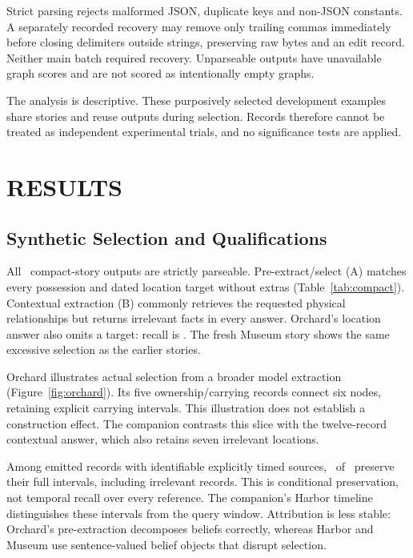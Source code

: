 \documentclass[a4paper,twoside]{article}
\begin{document}
Strict parsing rejects malformed JSON, duplicate keys and non-JSON constants. A separately recorded recovery may remove only trailing commas immediately before closing delimiters outside strings, preserving raw bytes and an edit record. Neither main batch required recovery. Unparseable outputs have unavailable graph scores and are not scored as intentionally empty graphs.

The analysis is descriptive. These purposively selected development examples share stories and reuse outputs during selection. Records therefore cannot be treated as independent experimental trials, and no significance tests are applied.

\AliceFigure






\section{\uppercase{Results}}

\subsection{Synthetic Selection and Qualifications}
\noindent All \CompactCalls\ compact-story outputs are strictly parseable. Pre-extract/select (A) matches every possession and dated location target without extras (Table~\ref{tab:compact}). Contextual extraction (B) commonly retrieves the requested physical relationships but returns irrelevant facts in every answer. Orchard's location answer also omits a target: recall is \OrchardLocationRecall. The fresh Museum story shows the same excessive selection as the earlier stories.



Orchard illustrates actual selection from a broader model extraction (Figure~\ref{fig:orchard}). Its five ownership/carrying records connect six nodes, retaining explicit carrying intervals. This illustration does not establish a construction effect. The companion contrasts this slice with the twelve-record contextual answer, which also retains seven irrelevant locations.

Among emitted records with identifiable explicitly timed sources, \IntervalsKept\ of \IntervalsEligible\ preserve their full intervals, including irrelevant records. This is conditional preservation, not temporal recall over every reference. The companion's Harbor timeline distinguishes these intervals from the query window. Attribution is less stable: Orchard's pre-extraction decomposes beliefs correctly, whereas Harbor and Museum use sentence-valued belief objects that disrupt selection.
\end{document}
